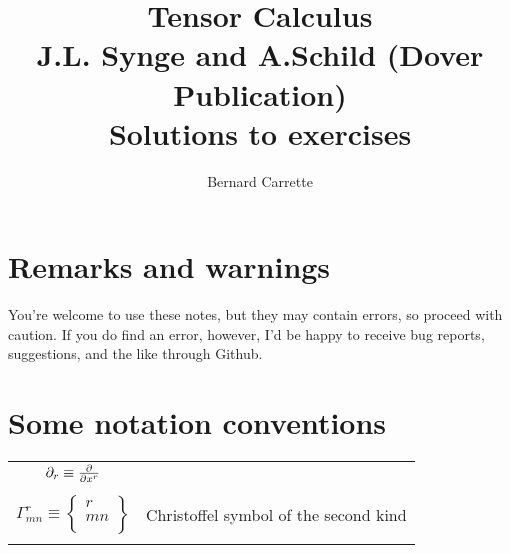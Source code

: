 \documentclass{ut-thesis}
\author{Bernard Carrette}
\title{Tensor Calculus\\J.L. Synge and A.Schild (Dover Publication)\\ Solutions to exercises}
\begin{document}
\maketitle

\section*{Remarks and warnings}
You're welcome to use these notes, but they may contain errors, so proceed with caution. If you do find an error, however, I'd be happy to receive bug reports, suggestions, and the like through Github.
\section*{Some notation conventions}
\begin{center}
\begin{tabular}{ c c  }
$\partial_r \equiv \pdv{}{x^r}$ & \\\\
$\Gamma^r_{mn} \equiv 
\begin{Bmatrix}
r\\
m n\\
\end{Bmatrix}$ & Christoffel symbol of the second kind\\\\

\end{tabular}
\end{center}

\tableofcontents
\listoffigures



%
%
\end{document}
